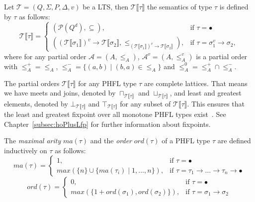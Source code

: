 \begin{definition}
    Let $\mathcal{T} = (Q, \Sigma, P, \Delta, v)$ be a LTS, then $\mathcal{T}\llbracket\tau\rrbracket$ the semantics
    of type $\tau$ is defined by $\tau$ as follows:
        \[\mathcal{T}\llbracket\tau\rrbracket=
        \begin{cases}
            (\mathcal{P}(Q^d), \subseteq),  & \text{if }\tau = \bullet\\
            ((\mathcal{T}\llbracket\sigma_1\rrbracket)^v \rightarrow \mathcal{T}\llbracket\sigma_2\rrbracket, \leq_{
            (\mathcal{T}\llbracket\sigma_1\rrbracket)^v \rightarrow \mathcal{T}\llbracket\sigma_2\rrbracket}), &
            \text{if }\tau = \sigma_1^v\rightarrow \sigma_2,
        \end{cases}\]
    where for any partial order $\mathcal{A} = (A, \leq_A)$, $\mathcal{A}^v = (A, \leq_A^v)$ is a partial order
    with $\leq_A^+ = \leq_A$, $\leq_A^- = \{(a, b) \mid (b, a) \in \leq_A\}$ and $\leq_A^0 = \leq_A^+ \cap \leq_A^-$.
\end{definition}

The partial orders $\mathcal{T}\llbracket\tau\rrbracket$ for any PHFL type $\tau$ are complete lattices. That means we
have meets and joins, denoted by $\sqcap_{\mathcal{T}\llbracket\tau\rrbracket}$ and
$\sqcup_{\mathcal{T}\llbracket\tau\rrbracket}$, and least and greatest elements, denoted by
$\bot_{\mathcal{T}\llbracket\tau\rrbracket}$ and $\top_{\mathcal{T}\llbracket\tau\rrbracket}$ for any subset of
$\mathcal{T}\llbracket\tau\rrbracket$. This ensures that the least and greatest fixpoint over all monotone PHFL types
exist~\cite{tarski1955lattice}. See Chapter~\ref{subsec:hoPlusLfp} for further information about fixpoints.

\begin{definition}
    The \emph{maximal arity} $ma(\tau)$ and the \emph{order} $ord(\tau)$ of a PHFL type $\tau$ are defined
    inductively on
    $\tau$ as follows:
\[ma(\tau)=
\begin{cases}
    1, & \text{if }\tau = \bullet\\
    max(\{n\} \cup \{ma(\tau_i)\mid1,\dots,n\}), &
    \text{if }\tau = \tau_1\rightarrow\dots\rightarrow\tau_n\rightarrow\bullet
\end{cases}\]
\[ord(\tau)=
\begin{cases}
    0, & \text{if }\tau = \bullet\\
    max(\{1 + ord(\sigma_1), ord(\sigma_2)\}), & \text{if }\tau = \sigma_1 \rightarrow \sigma_2
\end{cases}\]
\end{definition}

